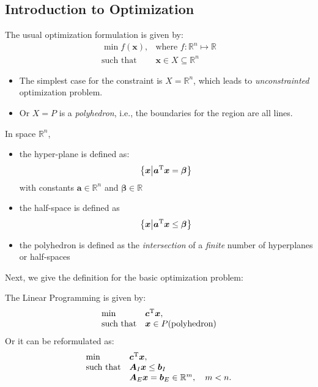\subsection{Introduction to Optimization}
The usual optimization formulation is given by:
\[\begin{array}{ll}
\min f(\bm x),
&
\mbox{where }f:\mathbb{R}^n\mapsto\mathbb{R}
\\
\mbox{such that}
&
\bm x\in X\subseteq\mathbb{R}^n
\end{array}
\]
\begin{itemize}
\item
The simplest case for the constraint is $X=\mathbb{R}^n$, which leads to \emph{unconstrainted} optimization problem.
\item
Or $X=P$ is a \emph{polyhedron}, i.e., the boundaries for the region are all lines.
\end{itemize}
\begin{definition}
In space $\mathbb{R}^n$, 
\begin{itemize}
\item
the hyper-plane is defined as:
\[
\left\{
\bm x\middle |\bm a^{\mathrm T}\bm x=\bm\beta
\right\}
\]
with constants $\bm a\in\mathbb{R}^n$ and $\bm\beta\in\mathbb{R}$
\item
the half-space is defined as
\[
\left\{
\bm x\middle |\bm a^{\mathrm T}\bm x\le\bm\beta
\right\}
\]
\item
the polyhedron is defined as the \emph{intersection} of a \emph{finite} number of hyperplanes or half-spaces
\end{itemize}
\end{definition}
Next, we give the definition for the basic optimization problem:
\begin{definition}
The Linear Programming is given by:
\[\begin{array}{ll}
\min& \bm c^{\mathrm T}\bm x,
\\
\mbox{such that}
&
\bm x\in P (\mbox{polyhedron})
\end{array}
\]
Or it can be reformulated as:
\[\begin{array}{ll}
\min& \bm c^{\mathrm T}\bm x,
\\
\mbox{such that}
&
\bm A_I\bm x\le\bm b_I\\
&
\bm A_E\bm x=\bm b_E\in\mathbb{R}^m,\quad m<n.
\end{array}
\]
\end{definition}

